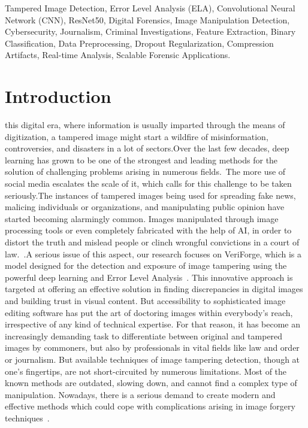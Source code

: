 \documentclass{ieeeaccess}
\begin{document}
\begin{keywords}
	Tampered Image Detection, Error Level Analysis (ELA), Convolutional Neural Network (CNN), ResNet50, Digital Forensics, Image Manipulation Detection, Cybersecurity, Journalism, Criminal Investigations, Feature Extraction, Binary Classification, Data Preprocessing, Dropout Regularization, Compression Artifacts, Real-time Analysis, Scalable Forensic Applications.
\end{keywords}

\titlepgskip=-21pt

\maketitle

\section{Introduction}
\label{sec:introduction}
 this digital era, where information is usually imparted through the means of digitization, a tampered image might start a wildfire of misinformation, controversies, and disasters in a lot of sectors.Over the last few decades, deep learning has grown to be one of the strongest and leading methods for the solution of challenging problems arising in numerous fields.~\cite{10035377}The more use of social media escalates the scale of it, which calls for this challenge to be taken seriously.The instances of tampered images being used for spreading fake news, malicing individuals or organizations, and manipulating public opinion have started becoming alarmingly common. Images manipulated through image processing tools or even completely fabricated with the help of AI, in order to distort the truth and mislead people or clinch wrongful convictions in a court of law.~\cite{8755865}.A serious issue of this aspect, our research focuses on VeriForge, which is a model designed for the detection and exposure of image tampering using the powerful deep learning and Error Level Analysis~\cite{gupta2022detection}. This innovative approach is targeted at offering an effective solution in finding discrepancies in digital images and building trust in visual content. But accessibility to sophisticated image editing software has put the art of doctoring images within everybody's reach, irrespective of any kind of technical expertise. For that reason, it has become an increasingly demanding task to differentiate between original and tampered images by commoners, but also by professionals in vital fields like law and order or journalism. But available techniques of image tampering detection, though at one's fingertips, are not short-circuited by numerous limitations. Most of the known methods are outdated, slowing down, and cannot find a complex type of manipulation. Nowadays, there is a serious demand to create modern and effective methods which could cope with complications arising in image forgery techniques~\cite{kaur2019weak}.
\end{document}
